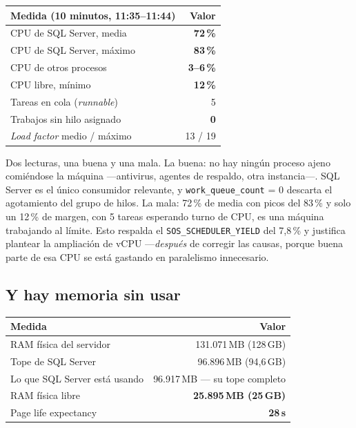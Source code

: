 \documentclass[11pt,a4paper]{article}
\newcommand{\cod}[1]{\texttt{\small #1}}
\newcommand{\critico}[1]{\textcolor{rojo}{\textbf{#1}}}
\newcommand{\bien}[1]{\textcolor{verde}{\textbf{#1}}}
\newcommand{\aviso}[1]{\textcolor{ambar}{\textbf{#1}}}
\begin{document}
\begin{table}[h]
\centering
\small
\begin{tabular}{lr}
\toprule
\textbf{Medida (10 minutos, 11:35--11:44)} & \textbf{Valor} \\
\midrule
CPU de SQL Server, media   & \aviso{72\,\%} \\
CPU de SQL Server, máximo  & \critico{83\,\%} \\
CPU de otros procesos      & \bien{3--6\,\%} \\
CPU libre, mínimo          & \critico{12\,\%} \\
Tareas en cola (\emph{runnable})  & 5 \\
Trabajos sin hilo asignado & \bien{0} \\
\emph{Load factor} medio / máximo & 13 / 19 \\
\bottomrule
\end{tabular}
\end{table}

Dos lecturas, una buena y una mala. La buena: no hay ningún proceso ajeno
comiéndose la máquina —antivirus, agentes de respaldo, otra instancia—. SQL
Server es el único consumidor relevante, y
\cod{work\_queue\_count} = 0 descarta el agotamiento del grupo de hilos. La
mala: 72\,\% de media con picos del 83\,\% y solo un 12\,\% de margen, con 5
tareas esperando turno de CPU, es una máquina trabajando al límite. Esto
respalda el \cod{SOS\_SCHEDULER\_YIELD} del 7,8\,\% y justifica plantear la
ampliación de vCPU —\emph{después} de corregir las causas, porque buena parte
de esa CPU se está gastando en paralelismo innecesario.

\subsection{Y hay memoria sin usar}

\begin{table}[h]
\centering
\small
\begin{tabular}{lr}
\toprule
\textbf{Medida} & \textbf{Valor} \\
\midrule
RAM física del servidor        & 131.071\,MB (128\,GB) \\
Tope de SQL Server             & 96.896\,MB (94,6\,GB) \\
Lo que SQL Server está usando  & 96.917\,MB — su tope completo \\
RAM física libre               & \critico{25.895\,MB (25\,GB)} \\
Page life expectancy           & \critico{28\,s} \\
\bottomrule
\end{tabular}
\end{table}
\end{document}
